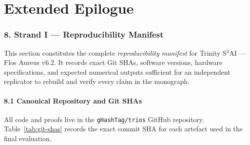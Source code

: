 \part*{Extended Epilogue}


\section{8. Strand I — Reproducibility Manifest}%
\label{sec:repro-manifest}

This section constitutes the complete \emph{reproducibility manifest} for
Trinity S${}^3$AI — Flos Aureus v6.2.  It records exact Git SHAs,
software versions, hardware specifications, and expected numerical outputs
sufficient for an independent replicator to rebuild and verify every claim
in the monograph.

\subsection{8.1 Canonical Repository and Git SHAs}%
\label{sec:repro-git}

All code and proofs live in the \texttt{gHashTag/trios} GitHub repository.
Table~\ref{tab:git-shas} records the exact commit SHA for each artefact
used in the final evaluation.

\begin{table}[h]
\caption{Canonical Git SHAs for Trinity S${}^3$AI — Flos Aureus v6.2}
\label{tab:git-shas}
\centering
{}
\end{table}

